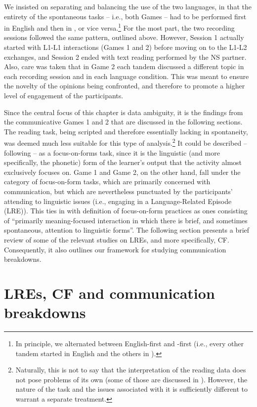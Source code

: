 \documentclass[output=paper,colorlinks,citecolor=brown,modfonts,nonflat]{../langscibook}
\begin{document}
We insisted on separating and balancing the use of the two languages, in that the entirety of the spontaneous tasks – i.e., both Games – had to be performed first in English and then in , or vice versa.\footnote{ {In principle, we alternated between English-first and -first (i.e., every other tandem started in English and the others in ).}} For the most part, the two recording sessions followed the same pattern, outlined above. However, Session 1 actually started with L1-L1 interactions (Games 1 and 2) before moving on to the L1-L2 exchanges, and Session 2 ended with text reading performed by the NS partner. Also, care was taken that in Game 2 each tandem discussed a different topic in each recording session and in each language condition. This was meant to ensure the novelty of the opinions being confronted, and therefore to promote a higher level of engagement of the participants.

Since the central focus of this chapter is data ambiguity, it is the findings from the communicative Games 1 and 2 that are discussed in the following sections. The reading task, being scripted and therefore essentially lacking in spontaneity, was deemed much less suitable for this type of analysis.\footnote{ {Naturally, this is not to say that the interpretation of the reading data does not pose problems of its own (some of those are discussed in \citealt{HorguesScheuer2014}). However, the nature of the task and the issues associated with it is sufficiently different to warrant a separate treatment.}} It could be described – following \citet{Long1991} – as a focus-on-forms task, since it is the linguistic (and more specifically, the phonetic) form of the learner’s output that the activity almost exclusively focuses on. Game 1 and Game 2, on the other hand, fall under the category of focus-on-form tasks, which are primarily concerned with communication, but which are nevertheless punctuated by the participants’ attending to linguistic issues (i.e., engaging in a Language-Related Episode (LRE)). This ties in with  definition of focus-on-form practices as ones consisting of “primarily meaning-focused interaction in which there is brief, and sometimes spontaneous, attention to linguistic forms”. The following section presents a brief review of some of the relevant studies on LREs, and more specifically, CF. Consequently, it also outlines our framework for studying communication breakdowns.

\largerpage
\section{LREs, CF and communication breakdowns}\label{sec:scheuer:3}
\end{document}

